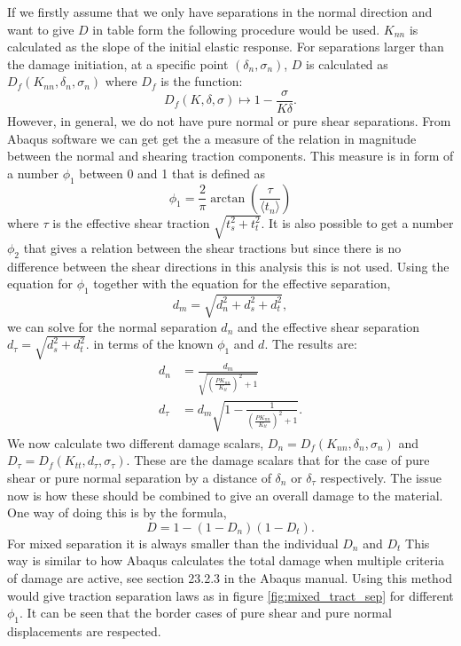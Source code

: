 \documentclass[generate_interface_elements.tex]{subfiles}
\begin{document}
If we firstly assume that we only have separations in the normal direction and want to give $D$ in table form the following procedure would be used. $K_{nn}$ is calculated as the slope of the initial elastic response. For separations larger than the damage initiation, at a specific point $(\delta_n, \sigma_n)$, $D$ is calculated as $D_f(K_{nn}, \delta_n, \sigma_n)$ where $D_f$ is the function:
%
\[ D_f(K, \delta, \sigma) \mapsto   1 - \frac{\sigma}{K\delta}. \]
%
However, in general, we do not have pure normal or pure shear separations. From Abaqus software we can get get the a measure of the relation in magnitude between the normal and shearing traction components. This measure is in form of a number $\phi_1$ between 0 and 1 that is defined as
%
\[ \phi_1 = \frac{2}{\pi} \arctan \left( \frac{ \tau}{\langle t_n \rangle} \right) \]
%
where $\tau$ is the effective shear traction $\sqrt{t_s^2 + t_t^2}$. It is also possible to get a number $\phi_2$ that gives a relation between the shear tractions but since there is no difference between the shear directions in this analysis this is not used. Using the equation for $\phi_1$ together with the equation for the effective separation,
%
\[ d_m = \sqrt{d_n^2 + d_s^2 + d_t^2},  \]
%
we can solve for the normal separation $d_n$ and the effective shear separation $ d_\tau = \sqrt{d_s^2 + d_t^2}.$ in terms of the known $\phi_1$ and $d$. The results are:
%
\begin{align}
 d_n & = \frac{d_m}{\sqrt{\left(\frac{PK_{nn}}{K_{tt}}\right)^2 + 1 }  }  \\
 d_\tau  & = d_m\sqrt{1 -\frac{1}{\left(\frac{PK_{nn}}{K_{tt}} \right)^2 + 1 }}.
\end{align}
%
We now calculate two different damage scalars, $D_n = D_f(K_{nn}, \delta_n, \sigma_n)$ and $D_\tau = D_f(K_{tt}, d_\tau, \sigma_\tau)$. These are the damage scalars that for the case of pure shear or pure normal separation by a distance of $\delta_n$ or $\delta_\tau$ respectively. The issue now is how these should be combined to give an overall damage to the material. One way of doing this is by the formula,
%
\[ D = 1 - (1 - D_n)(1 - D_t). \]
%
For mixed separation it is always smaller than the individual $D_n$ and $D_t$ This way is similar to how Abaqus calculates the total damage when multiple criteria of damage are active, see section 23.2.3 in the Abaqus manual. Using this method would give traction separation laws as in figure \ref{fig:mixed_tract_sep} for different $\phi_1$. It can be seen that the border cases of pure shear and pure normal displacements are respected.
\end{document}
